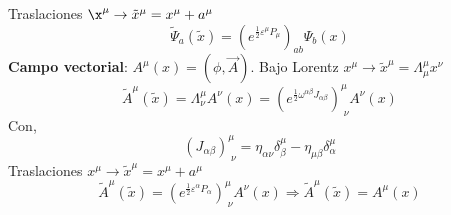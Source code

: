 \documentclass[../main.tex]{subfiles}
\begin{document}
 Traslaciones $\x^\mu \rightarrow \tilde{x}^\mu = x^\mu + a^\mu$
 \begin{equation*}
   \tilde{\Psi}_a(\tilde{x}) = \left( e^{\frac{1}{2}\varepsilon^\mu P_\mu} \right)_{ab} \Psi_b(x)
 \end{equation*}
\textbf{Campo vectorial}: $A^\mu(x) = \left( \phi,\vec{A} \right)$. Bajo Lorentz $x^\mu \rightarrow \tilde{x}^\mu = \Lambda^\mu_\mu x^\nu$
\begin{equation*}
  \tilde{{A}}^\mu (\tilde{x}) = \Lambda^\mu_\nu A^\nu(x) = \left( e^{\frac{1}{2}\omega^{\alpha \beta}J_{\alpha \beta}} \right)^\mu_{\; \nu} A^\nu(x)
\end{equation*}
Con,
\begin{equation*}
   \left( J_{\alpha \beta} \right)^\mu_{\; \nu} = \eta_{\alpha \nu} \delta^\mu_\beta - \eta_{\mu \beta}\delta^\mu_\alpha
\end{equation*}
Traslaciones $x^\mu \rightarrow \tilde{x}^\mu = x^\mu + a^\mu$
\begin{equation*}
  \tilde{{A}}^\mu(\tilde{x}) = \left( e^{\frac{1}{2}\varepsilon^\alpha P_\alpha} \right)^\mu_{\;\nu} A^\nu(x) \Rightarrow \tilde{{A}}^\mu(\tilde{x}) = A^\mu(x)
\end{equation*}
\end{document}
